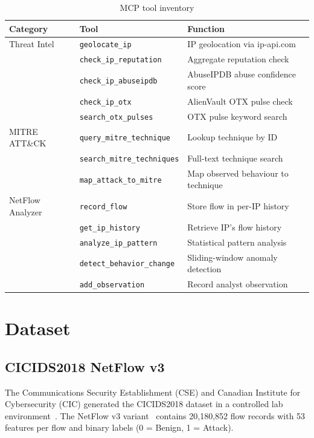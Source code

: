 \documentclass[12pt, a4paper, oneside]{report}
\begin{document}
\begin{table}[H]
\centering
\caption{MCP tool inventory}
\label{tab:mcp-tools}
\begin{tabular}{@{}llp{7cm}@{}}
\toprule
\textbf{Category} & \textbf{Tool} & \textbf{Function} \\
\midrule
Threat Intel    & \texttt{geolocate\_ip}         & IP geolocation via ip-api.com \\
                & \texttt{check\_ip\_reputation}  & Aggregate reputation check \\
                & \texttt{check\_ip\_abuseipdb}   & AbuseIPDB abuse confidence score \\
                & \texttt{check\_ip\_otx}         & AlienVault OTX pulse check \\
                & \texttt{search\_otx\_pulses}    & OTX pulse keyword search \\
\midrule
MITRE ATT\&CK  & \texttt{query\_mitre\_technique}  & Lookup technique by ID \\
                & \texttt{search\_mitre\_techniques} & Full-text technique search \\
                & \texttt{map\_attack\_to\_mitre}    & Map observed behaviour to technique \\
\midrule
NetFlow Analyzer & \texttt{record\_flow}            & Store flow in per-IP history \\
                 & \texttt{get\_ip\_history}        & Retrieve IP's flow history \\
                 & \texttt{analyze\_ip\_pattern}    & Statistical pattern analysis \\
                 & \texttt{detect\_behavior\_change} & Sliding-window anomaly detection \\
                 & \texttt{add\_observation}        & Record analyst observation \\
\bottomrule
\end{tabular}
\end{table}


\section{Dataset}
\label{sec:dataset}

\subsection{CICIDS2018 NetFlow v3}

The Communications Security Establishment (CSE) and Canadian Institute for
Cybersecurity (CIC) generated the CICIDS2018 dataset in a controlled lab
environment~\cite{sharafaldin2018cicids}. The NetFlow v3 variant~\cite{luay2025netflow, sarhan2021netflow} contains
20,180,852 flow records with 53 features per flow and binary labels
(0 = Benign, 1 = Attack).
\end{document}
